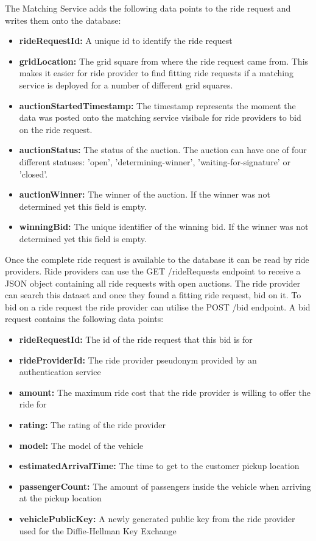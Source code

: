 The Matching Service adds the following data points to the ride request and writes them onto the database:

\begin{itemize}
    \item \textbf{rideRequestId:} A unique id to identify the ride request
    \item \textbf{gridLocation:} The grid square from where the ride request came from. This makes it easier for ride provider to find fitting ride requests if a matching service is deployed for a number of different grid squares. 
    \item \textbf{auctionStartedTimestamp:} The timestamp represents the moment the data was posted onto the matching service visibale for ride providers to bid on the ride request. 
    \item \textbf{auctionStatus:} The status of the auction. The auction can have one of four different statuses: 'open', 'determining-winner', 'waiting-for-signature' or 'closed'. 
    \item \textbf{auctionWinner:} The winner of the auction. If the winner was not determined yet this field is empty.
    \item \textbf{winningBid:} The unique identifier of the winning bid. If the winner was not determined yet this field is empty.
\end{itemize}

Once the complete ride request is available to the database it can be read by ride providers. Ride providers can use the GET /rideRequests endpoint to receive a JSON object containing all ride requests with open auctions. The ride provider can search this dataset and once they found a fitting ride request, bid on it.
To bid on a ride request the ride provider can utilise the POST /bid endpoint. A bid request contains the following data points:

\begin{itemize}
    \item \textbf{rideRequestId:} The id of the ride request that this bid is for
    \item \textbf{rideProviderId:} The ride provider pseudonym provided by an authentication service
    \item \textbf{amount:} The maximum ride cost that the ride provider is willing to offer the ride for
    \item \textbf{rating:} The rating of the ride provider
    \item \textbf{model:} The model of the vehicle
    \item \textbf{estimatedArrivalTime:} The time to get to the customer pickup location
    \item \textbf{passengerCount:} The amount of passengers inside the vehicle when arriving at the pickup location
    \item \textbf{vehiclePublicKey:} A newly generated public key from the ride provider used for the Diffie-Hellman Key Exchange 
\end{itemize}

